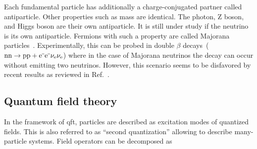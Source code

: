 
Each fundamental particle has additionally a charge-conjugated partner called antiparticle. Other properties such as mass are identical. The photon, Z boson, and Higgs boson are their own antiparticle. It is still under study if the neutrino is its own antiparticle. Fermions with such a property are called Majorana particles~\cite{Majorana2006}. Experimentally, this can be probed in double $\beta$ decays~($\mathrm{nn}\to\mathrm{pp}+\mathrm{e}^{\rmminus}\mathrm{e}^{\rmminus}\nu_\mathrm{e}\nu_\mathrm{e}$) where in the case of Majorana neutrinos the decay can occur without emitting two neutrinos. However, this scenario seems to be disfavored by recent results as reviewed in Ref.~\cite{Dell'Oro:2016dbc}.


\subsection{Quantum field theory}

In the framework of \gls{qft}, particles are described as excitation modes of quantized fields. This is also referred to as ``second quantization'' allowing to describe many-particle systems. Field operators can be decomposed as

